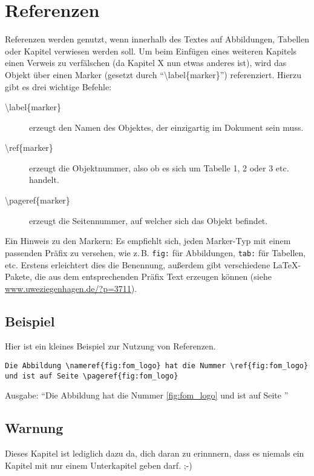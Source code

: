
\chapter{Referenzen}\label{ch:referenzen}

Referenzen werden genutzt, wenn innerhalb des Textes auf Abbildungen, Tabellen oder Kapitel verwiesen werden soll. 
Um beim Einfügen eines weiteren Kapitels einen Verweis zu verfälschen (da Kapitel X nun etwas anderes ist), wird das Objekt über einen Marker (gesetzt durch \enquote{\textbackslash label\{marker\}}) referenziert. 
Hierzu gibt es drei wichtige Befehle:

\begin{description}
\item[{\textbackslash label\{marker\}}] erzeugt den Namen des Objektes, der einzigartig im Dokument sein muss.
\item[{\textbackslash ref\{marker\}}] erzeugt die Objektnummer, also ob es sich um Tabelle 1, 2 oder 3 etc. handelt.
\item[{\textbackslash pageref\{marker\}}] erzeugt die Seitennummer, auf welcher sich das Objekt befindet.
\end{description}

Ein Hinweis zu den Markern: Es empfiehlt sich, jeden Marker-Typ mit einem passenden Präfix zu versehen, wie z.\,B. \texttt{fig:} für Abbildungen, \texttt{tab:} für Tabellen, etc. Erstens erleichtert dies die Benennung, außerdem gibt verschiedene \LaTeX-Pakete, die aus dem entsprechenden Präfix Text erzeugen können (siehe \url{www.uweziegenhagen.de/?p=3711}).

\section{Beispiel}
Hier ist ein kleines Beispiel zur Nutzung von Referenzen.

\begin{lstlisting}
Die Abbildung \nameref{fig:fom_logo} hat die Nummer \ref{fig:fom_logo} und ist auf Seite \pageref{fig:fom_logo}
\end{lstlisting}
Ausgabe: \enquote{Die Abbildung  hat die Nummer \ref{fig:fom_logo} und ist auf Seite \pageref{fig:fom_logo}}

\section{Warnung}

Dieses Kapitel ist lediglich dazu da, dich daran zu erinnnern, dass es niemals ein Kapitel mit nur einem Unterkapitel geben darf. ;-)